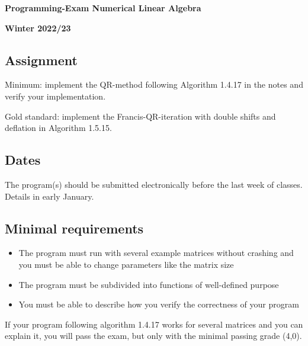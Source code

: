 \documentclass[a4paper]{article}
\begin{document}
\begin{center}
  \textbf{\Large Programming-Exam Numerical Linear Algebra}
  
  \textbf{Winter 2022/23}
\end{center}

\subsection*{Assignment}
Minimum: implement the QR-method following Algorithm 1.4.17 in the notes and
verify your implementation.

Gold standard: implement the Francis-QR-iteration with double shifts
and deflation in Algorithm 1.5.15.
\subsection*{Dates}

The program(s) should be submitted electronically before the last week of classes. Details in early January.

\subsection*{Minimal requirements}
\begin{itemize}
\item The program must run with several example matrices without
  crashing and you must be able to change parameters like the matrix
  size
\item The program must be subdivided into functions of well-defined
  purpose
\item You must be able to describe how you verify the correctness of
  your program
\end{itemize}

If your program following algorithm 1.4.17 works for several matrices and you can explain it, you will pass the exam, but only with the minimal passing grade (4,0).
\end{document}
